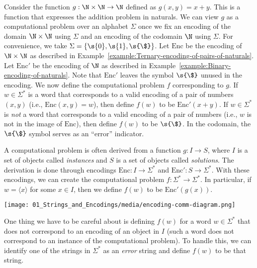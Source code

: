 \begin{example} \label{example:Addition-as-a-computational-problem}
Consider the function $g:\N \times \N \to \N$ defined as $g(x, y) = x + y$. 
This is a function that expresses the addition problem in naturals. 
We can view $g$ as a computational problem over an alphabet $\Sigma$ once we fix an encoding of the domain $\N \times \N$ using $\Sigma$ and an encoding of the codomain $\N$ using $\Sigma$. 
For convenience, we take $\Sigma = \{\s{0},\s{1},\s{\$}\}$. Let $\text{Enc}$ be the encoding of $\N \times \N$ as described in Example~\ref{example:Ternary-encoding-of-pairs-of-naturals}. 
Let $\text{Enc}'$ be the encoding of $\N$ as described in Example~\ref{example:Binary-encoding-of-naturals}. 
Note that $\text{Enc}'$ leaves the symbol $\s{\$}$ unused in the encoding. 
We now define the computational problem $f$ corresponding to $g$. 
If $w \in \Sigma^*$ is a word that corresponds to a valid encoding of a pair of numbers $(x, y)$ (i.e., $\text{Enc}(x,y) = w$), then define $f(w)$ to be $\text{Enc}'(x+y)$. 
If $w \in \Sigma^*$ is \emph{not} a word that corresponds to a valid encoding of a pair of numbers (i.e., $w$ is not in the image of $\text{Enc}$), then define $f(w)$ to be $\s{\$}$. 
In the codomain, the $\s{\$}$ symbol serves as an ``error'' indicator.
\end{example}

\begin{important} \label{important:Computational-problem-as-mapping-instances-to-solutions}
A computational problem is often derived from a function $g: I \to S$, where $I$ is a set of objects called \emph{instances} and $S$ is a set of objects called \emph{solutions}. 
The derivation is done through encodings $\text{Enc}: I \to \Sigma^*$ and $\text{Enc}': S \to \Sigma^*$. 
With these encodings, we can create the computational problem $f : \Sigma^* \to \Sigma^*$. 
In particular, if $w = \langle x \rangle$ for some $x \in I$, then we define $f(w)$ to be $\text{Enc}'(g(x))$.

\begin{center}
\texttt{[image: 01\_Strings\_and\_Encodings/media/encoding-comm-diagram.png]}
\end{center}

One thing we have to be careful about is defining $f(w)$ for a word $w \in \Sigma^*$ that does not correspond to an encoding of an object in $I$ (such a word does not correspond to an instance of the computational problem). 
To handle this, we can identify one of the strings in $\Sigma^*$ as an \emph{error} string and define $f(w)$ to be that string.
\end{important}


